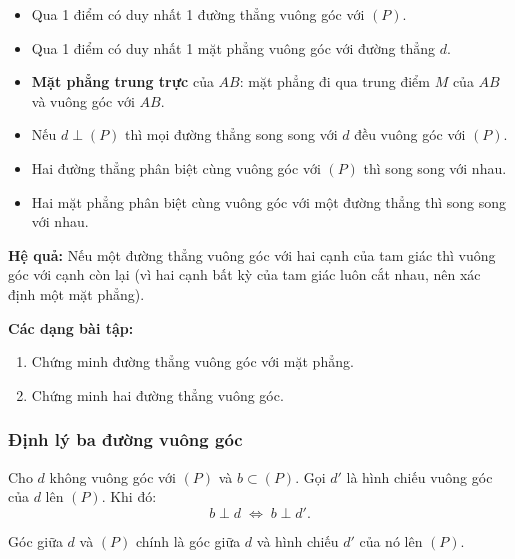 \documentclass[12pt,a4paper]{article}
\begin{document}
\begin{tinhchat}
  \begin{itemize}
    \item Qua 1 điểm có duy nhất 1 đường thẳng vuông góc với $(P)$.
    \item Qua 1 điểm có duy nhất 1 mặt phẳng vuông góc với đường thẳng $d$.
    \item \textbf{Mặt phẳng trung trực} của $AB$: mặt phẳng đi qua trung điểm $M$ của $AB$ và vuông góc với $AB$.
    \item Nếu $d \perp (P)$ thì mọi đường thẳng song song với $d$ đều vuông góc với $(P)$.
    \item Hai đường thẳng phân biệt cùng vuông góc với $(P)$ thì song song với nhau.
    \item Hai mặt phẳng phân biệt cùng vuông góc với một đường thẳng thì song song với nhau.
  \end{itemize}
\end{tinhchat}

\begin{luuy}
  \textbf{Hệ quả:} Nếu một đường thẳng vuông góc với hai cạnh của tam giác thì vuông góc với cạnh còn lại (vì hai cạnh bất kỳ của tam giác luôn cắt nhau, nên xác định một mặt phẳng).
\end{luuy}

\medskip\noindent\textbf{Các dạng bài tập:}
\begin{enumerate}[label=\textbf{Dạng \arabic*:}, leftmargin=*, align=left]
  \item Chứng minh đường thẳng vuông góc với mặt phẳng.
  \item Chứng minh hai đường thẳng vuông góc.
\end{enumerate}

\subsubsection{Định lý ba đường vuông góc}

\begin{dinhly}
  Cho $d$ không vuông góc với $(P)$ và $b \subset (P)$. Gọi $d'$ là hình chiếu vuông góc của $d$ lên $(P)$. Khi đó:
  \[
    b \perp d \;\Leftrightarrow\; b \perp d'.
  \]
\end{dinhly}

\begin{luuy}
  Góc giữa $d$ và $(P)$ chính là góc giữa $d$ và hình chiếu $d'$ của nó lên $(P)$.
\end{luuy}
\end{document}

